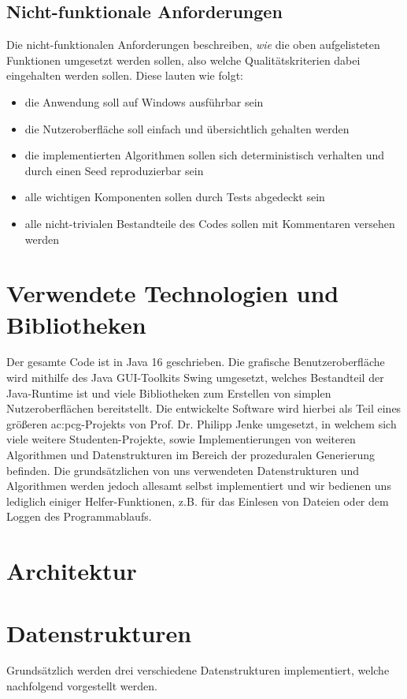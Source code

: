 \subsection{Nicht-funktionale Anforderungen}
Die nicht-funktionalen Anforderungen beschreiben, \textit{wie} die oben aufgelisteten Funktionen umgesetzt werden sollen, also
welche Qualitätskriterien dabei eingehalten werden sollen. Diese lauten wie folgt:

\begin{itemize}
    \item die Anwendung soll auf Windows ausführbar sein
    \item die Nutzeroberfläche soll einfach und übersichtlich gehalten werden
    \item die implementierten Algorithmen sollen sich deterministisch verhalten und durch einen Seed reproduzierbar sein
    \item alle wichtigen Komponenten sollen durch Tests abgedeckt sein
    \item alle nicht-trivialen Bestandteile des Codes sollen mit Kommentaren versehen werden
\end{itemize}

\section{Verwendete Technologien und Bibliotheken}
Der gesamte Code ist in Java 16 geschrieben. Die grafische Benutzeroberfläche wird mithilfe des Java GUI-Toolkits Swing umgesetzt,
welches Bestandteil der Java-Runtime ist und viele Bibliotheken zum Erstellen von simplen Nutzeroberflächen bereitstellt. Die
entwickelte Software wird hierbei als Teil eines größeren \gls{ac:pcg}-Projekts von Prof. Dr. Philipp Jenke umgesetzt, in welchem
sich viele weitere Studenten-Projekte, sowie Implementierungen von weiteren Algorithmen und Datenstrukturen im Bereich der prozeduralen
Generierung befinden. Die grundsätzlichen von uns verwendeten Datenstrukturen und Algorithmen werden jedoch allesamt selbst implementiert
und wir bedienen uns lediglich einiger Helfer-Funktionen, z.B. für das Einlesen von Dateien oder dem Loggen des Programmablaufs.

\section{Architektur}

\section{Datenstrukturen}
Grundsätzlich werden drei verschiedene Datenstrukturen implementiert, welche nachfolgend vorgestellt werden.

